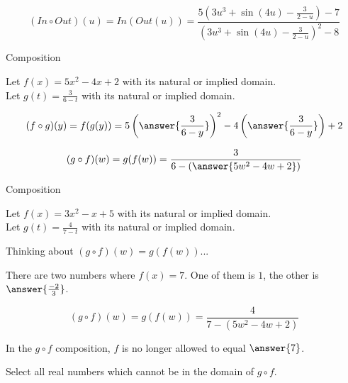 \documentclass{ximera}
\begin{document}
\[
(In \circ Out)(u) = In(Out(u)) = \frac{5 \left( 3u^3 + \sin(4u) - \frac{3}{2-u} \right)-7}{\left( 3u^3 + \sin(4u) - \frac{3}{2-u} \right)^2-8}
\]





\begin{example} Composition 



Let $f(x) = 5x^2 - 4x + 2$ with its natural or implied domain. \\
Let $g(t) = \frac{3}{6-t}$ with its natural or implied domain. 



\[
(f \circ g)(y) = f(g(y)) = 5 \left( \answer{\frac{3}{6-y}} \right)^2 - 4 \left( \answer{\frac{3}{6-y}} \right) + 2
\]





\[
(g \circ f)(w) = g(f(w)) = \frac{3}{6 - \left( \answer{5w^2 - 4w + 2} \right)}
\]



\end{example}










\begin{example} Composition 



Let $f(x) = 3x^2 - x + 5$ with its natural or implied domain. \\
Let $g(t) = \frac{4}{7-t}$ with its natural or implied domain. 



Thinking about $(g \circ f)(w) = g(f(w))$... 

There are two numbers where $f(x) = 7$.  One of them is $1$, the other is $\answer{\frac{-2}{3}}$.






\[
(g \circ f)(w) = g(f(w)) = \frac{4}{7 - (5w^2 - 4w + 2)}
\]



In the $g \circ f$ composition, $f$ is no longer allowed to equal $\answer{7}$.

Select all real numbers which cannot be in the domain of $g \circ f$.

\begin{selectAll}
\end{selectAll}


\end{example}
\end{document}
